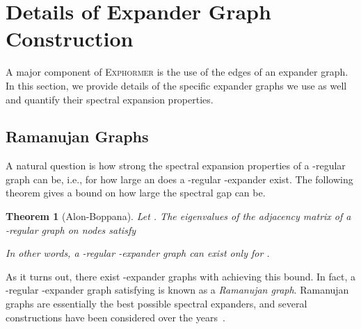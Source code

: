 \documentclass{article}
\theoremstyle{plain}
\newtheorem{theorem}{Theorem}[section]
\theoremstyle{definition}
\theoremstyle{remark}
\begin{document}
\begin{table}[htbp]
\centering
    \caption{Comparison of attention mechanisms on the ogbn-arxiv dataset by fixing the network size.}
    \label{tab:arxiv}
    \fontsize{8.5pt}{8.5pt}\selectfont
    \vspace{-0.1in}
\end{table}

\section{Details of Expander Graph Construction} \label{sec:expander-details}
A major component of \textsc{Exphormer} is the use of the edges of an expander graph. In this section, we provide details of the specific expander graphs we use as well and quantify their spectral expansion  properties.

\subsection{Ramanujan Graphs}
A natural question is how strong the spectral expansion properties of a -regular graph can be, i.e., for how large an  does a -regular -expander exist. The following theorem gives a bound on how large the spectral gap can be.
\begin{theorem}[Alon-Boppana]
 Let . The eigenvalues of the adjacency matrix of a -regular graph on  nodes satisfy 
 
 In other words, a -regular -expander graph can exist only for .
\end{theorem}

As it turns out, there exist -expander graphs with  achieving this bound. In fact, a -regular -expander graph satisfying  is known as a \emph{Ramanujan graph}. Ramanujan graphs are essentially the best possible spectral expanders, and several constructions have been considered over the years~\citep{LubotzkyPS88, Margulis88}.
\end{document}
